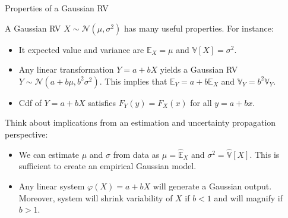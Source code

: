 \documentclass[9pt]{beamer}
\begin{document}
%
\begin{frame}{Properties of a Gaussian RV}

A Gaussian RV $X\sim \mathcal{N}(\mu,\sigma^2)$ has many useful properties. For instance:
\begin{block}{}
\begin{itemize}
\setlength{\itemsep}{10pt}
\item It expected value and variance are $\mathbb{E}_X=\mu$ and $\mathbb{V}[X]=\sigma^2$. 
\item Any linear transformation $Y=a+bX$ yields a Gaussian RV $Y\sim \mathcal{N}(a+b\mu,b^2\sigma^2)$. This implies that $\mathbb{E}_Y=a+b\mathbb{E}_X$ and $\mathbb{V}_Y=b^2\mathbb{V}_Y$. 
\item Cdf of $Y=a+bX$ satisfies $F_Y(y)=F_X(x)$ for all $y=a+bx$. 
\end{itemize}
\end{block}
Think about implications from an estimation and uncertainty propagation perspective: 
\begin{block}{}
\begin{itemize}
\setlength{\itemsep}{10pt}
\item We can estimate  $\mu$ and $\sigma$ from data as $\mu =\hat{\mathbb{E}}_X$ and $\sigma^2=
\hat{\mathbb{V}}[X]$. This is sufficient to create an empirical Gaussian model. 
\item Any linear system $\varphi(X)=a+bX$ will generate a Gaussian output. Moreover, system will shrink variability of $X$ if $b<1$ and will magnify if $b>1$. 
\end{itemize}
\end{block}

\end{frame}
\end{document}
